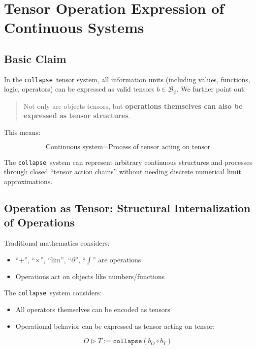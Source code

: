 \documentclass[12pt,a4paper]{article}
\theoremstyle{plain}
\theoremstyle{definition}
\theoremstyle{remark}
\newcommand{\collapse}{\texttt{collapse}}
\newcommand{\Bphi}{\mathcal{B}_\phi}
\begin{document}
\appendix

\section{Tensor Operation Expression of Continuous Systems}

\subsection{Basic Claim}

In the \collapse\ tensor system, all information units (including values, functions, logic, operators) can be expressed as valid tensors $b \in \Bphi$. We further point out:

\begin{quote}
Not only are objects tensors, but \textbf{operations themselves can also be expressed as tensor structures}.
\end{quote}

This means:

\begin{equation}
\text{Continuous system} = \text{Process of tensor acting on tensor}
\end{equation}

The \collapse\ system can represent arbitrary continuous structures and processes through closed ``tensor action chains'' without needing discrete numerical limit approximations.

\subsection{Operation as Tensor: Structural Internalization of Operations}

Traditional mathematics considers:
\begin{itemize}
\item ``+'', ``$\times$'', ``lim'', ``$\partial$'', ``$\int$'' are operations
\item Operations act on objects like numbers/functions
\end{itemize}

The \collapse\ system considers:
\begin{itemize}
\item All operators themselves can be encoded as tensors
\item Operational behavior can be expressed as tensor acting on tensor:
\end{itemize}

\begin{equation}
O \triangleright T := \collapse(b_O \circ b_T)
\end{equation}
\end{document}
